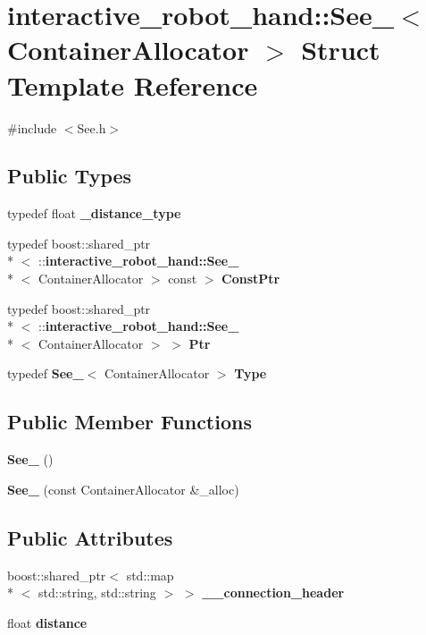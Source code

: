 \section{interactive\-\_\-robot\-\_\-hand\-:\-:See\-\_\-$<$ Container\-Allocator $>$ Struct Template Reference}
\label{structinteractive__robot__hand_1_1See__}


{\ttfamily \#include $<$See.\-h$>$}

\subsection*{Public Types}
\begin{DoxyCompactItemize}
\item 
typedef float {\bf \-\_\-distance\-\_\-type}
\item 
typedef boost\-::shared\-\_\-ptr\\*
$<$ \-::{\bf interactive\-\_\-robot\-\_\-hand\-::\-See\-\_\-}\\*
$<$ Container\-Allocator $>$ const  $>$ {\bf Const\-Ptr}
\item 
typedef boost\-::shared\-\_\-ptr\\*
$<$ \-::{\bf interactive\-\_\-robot\-\_\-hand\-::\-See\-\_\-}\\*
$<$ Container\-Allocator $>$ $>$ {\bf Ptr}
\item 
typedef {\bf See\-\_\-}$<$ Container\-Allocator $>$ {\bf Type}
\end{DoxyCompactItemize}
\subsection*{Public Member Functions}
\begin{DoxyCompactItemize}
\item 
{\bf See\-\_\-} ()
\item 
{\bf See\-\_\-} (const Container\-Allocator \&\-\_\-alloc)
\end{DoxyCompactItemize}
\subsection*{Public Attributes}
\begin{DoxyCompactItemize}
\item 
boost\-::shared\-\_\-ptr$<$ std\-::map\\*
$<$ std\-::string, std\-::string $>$ $>$ {\bf \-\_\-\-\_\-connection\-\_\-header}
\item 
float {\bf distance}
\end{DoxyCompactItemize}


